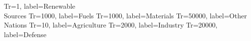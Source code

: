\documentclass{standalone}
\begin{document}
\begin{energese}
          {Tr=1,     label={Renewable\\Sources}}
         {Tr=1000,  label={Fuels}}
          {Tr=1000,  label={Materials}}
        {Tr=50000, label={Other\\Nations}}
       {Tr=10,    label={Agriculture}}
            {Tr=2000,  label={Industry}}
            {Tr=20000, label={Defense}}
\end{energese}
\end{document}

